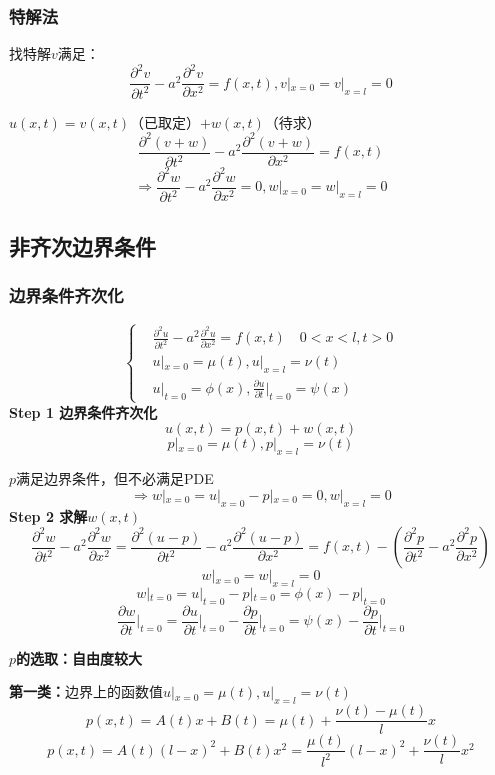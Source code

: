 \subsubsection{特解法}
找特解$v$满足：$$\frac{\partial^2{v}}{\partial{t}^2}-a^2\frac{\partial^2{v}}{\partial{x}^2}=f(x,t), v|_{x=0}=v|_{x=l}=0$$

$u(x,t)=v(x,t)$（已取定）$+w(x,t)$（待求）
$$\frac{\partial^2{(v+w)}}{\partial{t}^2}-a^2\frac{\partial^2{(v+w)}}{\partial{x}^2}=f(x,t)$$
$$\Rightarrow \frac{\partial^2{w}}{\partial{t}^2}-a^2\frac{\partial^2{w}}{\partial{x}^2}=0, w|_{x=0}=w|_{x=l}=0$$

\subsection{非齐次边界条件}
\subsubsection{边界条件齐次化}
$$\left\{
    \begin{aligned}
    &
    \frac{\partial^2{u}}{\partial{t}^2}-a^2\frac{\partial^2{u}}{\partial{x}^2}=f(x,t)\quad 0<x<l,t>0\\
    &u|_{x=0}=\mu(t),u|_{x=l}=\nu(t)\\
    &u|_{t=0}=\phi(x),\frac{\partial{u}}{\partial t}\bigg|_{t=0}=\psi(x)
            \end{aligned}
    \right.$$
\noindent\textbf{Step 1 边界条件齐次化}
$$u(x,t)=p(x,t)+w(x,t)$$
$$p|_{x=0}=\mu(t),p|_{x=l}=\nu(t)$$

$p$满足边界条件，但不必满足PDE
$$\Rightarrow w|_{x=0}=u|_{x=0}-p|_{x=0}=0,w|_{x=l}=0$$
\noindent\textbf{Step 2 求解$w(x,t)$}
$$\frac{\partial^2{w}}{\partial{t}^2}-a^2\frac{\partial^2{w}}{\partial{x}^2}=\frac{\partial^2{(u-p)}}{\partial{t}^2}-a^2\frac{\partial^2{(u-p)}}{\partial{x}^2}=f(x,t)-\left(\frac{\partial^2{p}}{\partial{t}^2}-a^2\frac{\partial^2{p}}{\partial{x}^2}\right)$$
$$w|_{x=0}=w|_{x=l}=0$$
$$w|_{t=0}=u|_{t=0}-p|_{t=0}=\phi(x)-p|_{t=0}$$
$$\frac{\partial{w}}{\partial t}\bigg|_{t=0}=\frac{\partial{u}}{\partial t}\bigg|_{t=0}-\frac{\partial{p}}{\partial t}\bigg|_{t=0}=\psi(x)-\frac{\partial{p}}{\partial t}\bigg|_{t=0}$$

\noindent\textbf{$p$的选取：自由度较大}

\textbf{第一类：}边界上的函数值$u|_{x=0}=\mu(t),u|_{x=l}=\nu(t)$
    $$p(x,t)=A(t)x+B(t)=\mu(t)+\frac{\nu(t)-\mu(t)}{l}x$$
    $$p(x,t)=A(t)(l-x)^2+B(t)x^2=\frac{\mu(t)}{l^2}(l-x)^2+\frac{\nu(t)}{l}x^2$$

